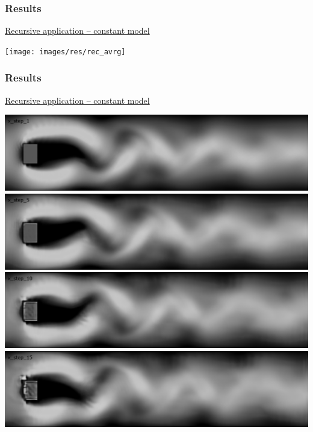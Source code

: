 \documentclass[18pt]{beamer}
\begin{document}
\begin{frame}[t]
  \frametitle{Results}
  \vspace{-1.0cm}
  \begin{center}
    {\large \underline{Recursive application -- constant model}} \\
  \end{center}
  \vspace{-0.4cm}
  \begin{center}
    \texttt{[image: images/res/rec\_avrg]}
  \end{center}
\end{frame}

\begin{frame}[t]
  \frametitle{Results}
  \vspace{-1cm}
  \begin{center}
    {\large \underline{Recursive application -- constant model}} \\
  \end{center}
  \vspace{1cm}
  \begin{center}
    \includegraphics[scale=0.15]{images/res/x_step_1}
    \includegraphics[scale=0.15]{images/res/x_step_5}
    \includegraphics[scale=0.15]{images/res/x_step_10}
    \includegraphics[scale=0.15]{images/res/x_step_15}

\end{center}
\end{frame}
\end{document}

